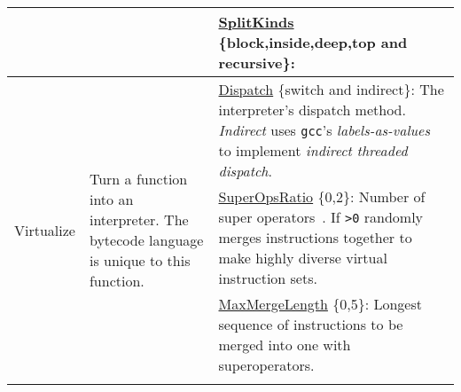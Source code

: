 \begin{table*}[p]
\begin{tabular}{|p{2.25cm}|p{4cm}|p{11cm}|}
                                     &                                                                                                                                                                                                                                                                                                         & \underline{SplitKinds} \{block,inside,deep,top and recursive\}: \\ \hline
\multirow{5}{*}{Virtualize}          & \multirow{5}{4cm}{Turn a function into an interpreter. The bytecode language is unique to this function. 
}                                                                                                                                                                                                                                                  & \underline{Dispatch} \{switch and indirect\}: The interpreter's dispatch method. {\em Indirect} uses {\tt gcc}'s {\em labels-as-values} to implement {\em indirect threaded dispatch}.                                                                                                                                                                                                                                                                               \\ \cline{3-3} 
                                     &                                                                                                                                                                                                                                                                                                         & \underline{SuperOpsRatio} \{0,2\}: Number of super operators~\cite{proebsting96optimizing}. If {\tt >0} randomly merges  instructions together to make highly diverse virtual instruction sets.                                                                                                                                                                                                                                                                                                      \\ \cline{3-3} 
                                     &                                                                                                                                                                                                                                                                                                         & \underline{MaxMergeLength} \{0,5\}: Longest sequence of instructions to be merged into one with superoperators.                                                                                                                                                                                                                                                                        \\ \cline{3-3} 

\end{tabular}
\end{table*}
